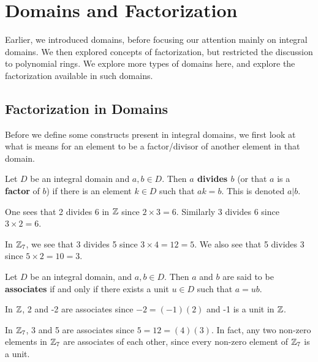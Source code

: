 \chapter{Domains and Factorization}
Earlier, we introduced domains, before focusing our attention mainly on integral domains. We then explored concepts of factorization, but restricted the discussion to polynomial rings. We explore more types of domains here, and explore the factorization available in such domains.

\section{Factorization in Domains}
Before we define some constructs present in integral domains, we first look at what is means for an element to be a factor/divisor of another element in that domain.

\begin{definition}
    Let $D$ be an integral domain and $a,b \in D$. Then \textbf{$a$ divides $b$} (or that $a$ is a \textbf{factor} of $b$) if there is an element $k \in D$ such that $ak = b$. This is denoted $a \vert b$.
\end{definition}
\begin{example}
    One sees that 2 divides 6 in $\mathbb{Z}$ since $2 \times 3 = 6$. Similarly 3 divides 6 since $3 \times 2 = 6$.
\end{example}
\begin{example}
    In $\mathbb{Z}_7$, we see that 3 divides 5 since $3 \times 4 = 12 = 5$. We also see that 5 divides 3 since $5 \times 2 = 10 = 3$.
\end{example}

\begin{definition}
    Let $D$ be an integral domain, and $a,b \in D$. Then $a$ and $b$ are said to be \textbf{associates} if and only if there exists a unit $u \in D$ such that $a = ub$.
\end{definition}

\begin{example}
    In $\mathbb{Z}$, 2 and -2 are associates since $-2 = (-1)(2)$ and -1 is a unit in $\mathbb{Z}$.
\end{example}

\begin{example}
    In $\mathbb{Z}_7$, 3 and 5 are associates since $5 = 12 = (4)(3)$. In fact, any two non-zero elements in $\mathbb{Z}_7$ are associates of each other, since every non-zero element of $\mathbb{Z}_7$ is a unit.
\end{example}

